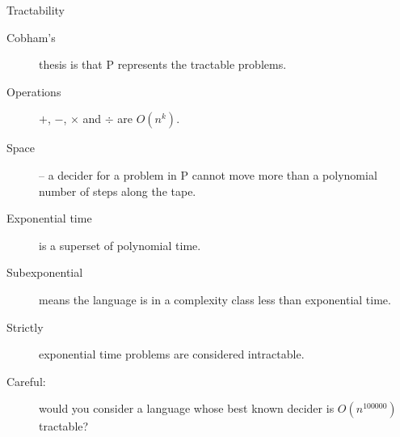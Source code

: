 \documentclass{beamer}
\begin{document}
\begin{frame}{Tractability}
  
  \begin{description}
    \item[Cobham's] thesis is that P represents the tractable problems.
    \item[Operations] $+$, $-$, $\times$ and $\div$ are \(O(n^k)\).
    \item[Space] -- a decider for a problem in P cannot move more than a polynomial number of steps along the tape.
    \item[Exponential time] is a superset of polynomial time.
    \item[Subexponential] means the language is in a complexity class less than exponential time.
    \item[Strictly] exponential time problems are considered intractable.
    \item[Careful:] would you consider a language whose best known decider is $O(n^{100000})$ tractable?
  \end{description}


\end{frame}
\end{document}
